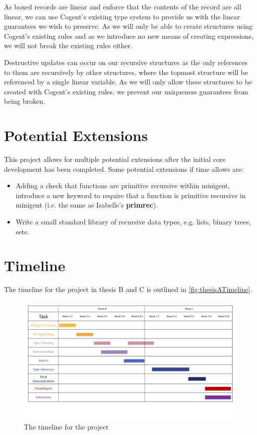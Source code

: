 As boxed records are linear and enforce that the contents of the record are all linear, we
can use Cogent's existing type system to provide us with the linear guarantees we wish to preserve.
As we will only be able to create structures using Cogent's existing rules and as we introduce
no new means of creating expressions, we will not break the existing rules either. 

Destructive updates can occur on our recursive structures as the only references to them are
recursively by other structures, where the topmost structure will be referenced by a single linear
variable. As we will only allow these structures to be created with Cogent's existing rules,
we prevent our uniqueness guarantees from being broken.

\section{Potential Extensions}

This project allows for multiple potential extensions after the initial core development has been completed.
Some potential extensions if time allows are:

\begin{itemize}
    \item Adding a check that functions are primitive recursive within minigent, introduce a new keyword
          to require that a function is primitive recursive in minigent (i.e. the same as
          Isabelle's \textbf{primrec}).
    \item Write a small standard library of recursive data types, e.g. lists, binary trees, 
          sets.
\end{itemize}

\section{Timeline}

The timeline for the project in thesis B and C is outlined in \autoref{fig:thesisATimeline}.

\begin{figure}
    \centering
    \includegraphics[height=0.55\textheight, angle=90]{content/previous_plan.jpg}
    \caption{The timeline for the project}
    \label{fig:thesisATimeline}
\end{figure}